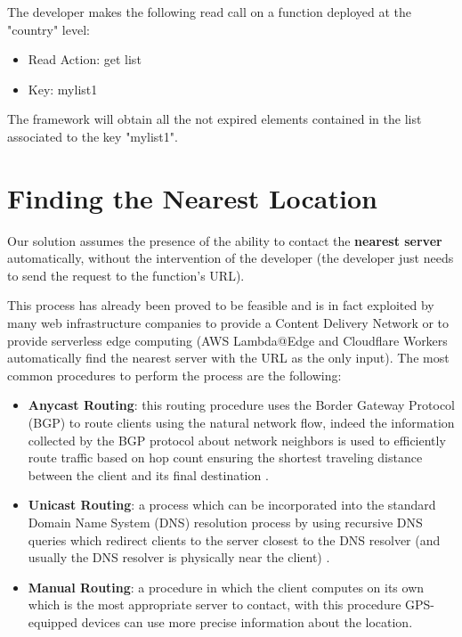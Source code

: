 \begin{example}
The developer makes the following read call on a function deployed at the "country" level:
\begin{itemize}
    \item Read Action: get list
    \item Key: mylist1
\end{itemize}
The framework will obtain all the not expired elements contained in the list associated to the key "mylist1".
\end{example}


\section{Finding the Nearest Location}
Our solution assumes the presence of the ability to contact the \textbf{nearest server} automatically, without the intervention of the developer (the developer just needs to send the request to the function's URL).

This process has already been proved to be feasible and is in fact exploited by many web infrastructure companies to provide a Content Delivery Network or to provide serverless edge computing (AWS Lambda@Edge and Cloudflare Workers automatically find the nearest server with the URL as the only input). The most common procedures to perform the process are the following:
\begin{itemize}
    \item \textbf{Anycast Routing}: this routing procedure uses the Border Gateway Protocol (BGP) to route clients using the natural network flow, indeed the information collected by the BGP protocol about network neighbors is used to efficiently route traffic based on hop count ensuring the shortest traveling distance between the client and its final destination \cite{anycast-cloudflare}.
    \item \textbf{Unicast Routing}: a process which can be incorporated into the standard Domain Name System (DNS) resolution process by using recursive DNS queries which redirect clients to the server closest to the DNS resolver (and usually the DNS resolver is physically near the client) \cite{unicast-vs-anycast}.
    \item \textbf{Manual Routing}: a procedure in which the client computes on its own which is the most appropriate server to contact, with this procedure GPS-equipped devices can use more precise information about the location.
\end{itemize}

